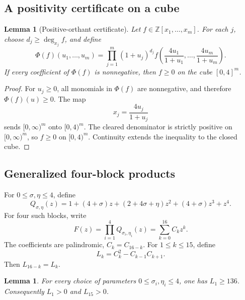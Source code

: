 \documentclass[11pt]{amsart}
\newtheorem{lemma}[theorem]{Lemma}
\newcommand{\Z}{\mathbb Z}
\begin{document}
\subsection{A positivity certificate on a cube}

\begin{lemma}[Positive-orthant certificate]\label{lem:positive-orthant-certificate}
Let \(f\in\Z[x_1,\ldots,x_m]\).  For each \(j\), choose \(d_j\ge \deg_{x_j}f\), and define
\[
        \Phi(f)(u_1,\ldots,u_m)
        =\prod_{j=1}^m(1+u_j)^{d_j}
        f\left(\frac{4u_1}{1+u_1},\ldots,
                \frac{4u_m}{1+u_m}\right).
\]
If every coefficient of \(\Phi(f)\) is nonnegative, then \(f\ge0\) on the cube \([0,4]^m\).
\end{lemma}

\begin{proof}
For \(u_j\ge0\), all monomials in \(\Phi(f)\) are nonnegative, and therefore \(\Phi(f)(u)\ge0\).  The map
\[
        x_j=\frac{4u_j}{1+u_j}
\]
sends \([0,\infty)^m\) onto \([0,4)^m\).  The cleared denominator is strictly positive on \([0,\infty)^m\), so \(f\ge0\) on \([0,4)^m\).  Continuity extends the inequality to the closed cube.
\end{proof}

\subsection{Generalized four-block products}

For \(0\le \sigma,
\eta\le4\), define
\begin{equation}\label{eq:Q-sigma-eta}
        Q_{\sigma,\eta}(z)
        =1+(4+\sigma)z+(2+4\sigma+\eta)z^2
        +(4+\sigma)z^3+z^4.
\end{equation}
For four such blocks, write
\begin{equation}\label{eq:F-general}
        F(z)=\prod_{i=1}^4 Q_{\sigma_i,\eta_i}(z)
        =\sum_{k=0}^{16}C_k z^k.
\end{equation}
The coefficients are palindromic, \(C_k=C_{16-k}\).  For \(1\le k\le15\), define
\[
        L_k=C_k^2-C_{k-1}C_{k+1}.
\]
Then \(L_{16-k}=L_k\).

\begin{lemma}\label{lem:first-margin}
For every choice of parameters \(0\le\sigma_i,\eta_i\le4\), one has \(L_1\ge136\).  Consequently \(L_1>0\) and \(L_{15}>0\).
\end{lemma}
\end{document}
